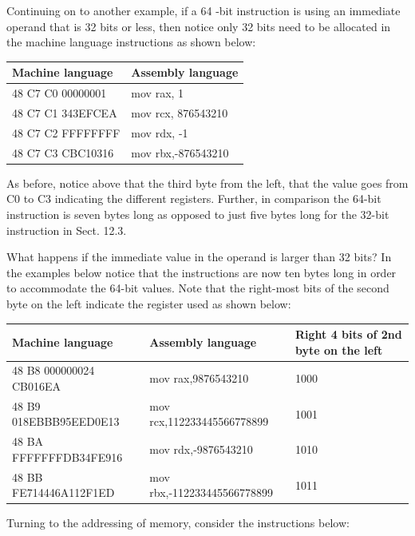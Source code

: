 \documentclass[10pt]{book}
\begin{document}
Continuing on to another example, if a 64 -bit instruction is using an immediate operand that is 32 bits or less, then notice only 32 bits need to be allocated in the machine language instructions as shown below:

\begin{center}
\begin{tabular}{|l|l|}
\hline
Machine language & Assembly language \\
\hline
48 C7 C0 00000001 & mov rax, 1 \\
\hline
48 C7 C1 343EFCEA & mov rcx, 876543210 \\
\hline
48 C7 C2 FFFFFFFF & mov rdx, -1 \\
\hline
48 C7 C3 CBC10316 & mov rbx,-876543210 \\
\hline
\end{tabular}
\end{center}

As before, notice above that the third byte from the left, that the value goes from C0 to C3 indicating the different registers. Further, in comparison the 64-bit instruction is seven bytes long as opposed to just five bytes long for the 32-bit instruction in Sect. 12.3.


What happens if the immediate value in the operand is larger than 32 bits? In the examples below notice that the instructions are now ten bytes long in order to accommodate the 64-bit values. Note that the right-most bits of the second byte on the left indicate the register used as shown below:

\begin{center}
\begin{tabular}{|l|l|l|}
\hline
Machine language & Assembly language & Right 4 bits of 2nd byte on the left \\
\hline
48 B8 000000024 CB016EA & mov rax,9876543210 & 1000 \\
\hline
48 B9 018EBBB95EED0E13 & mov rcx,112233445566778899 & 1001 \\
\hline
48 BA FFFFFFFDB34FE916 & mov rdx,-9876543210 & 1010 \\
\hline
48 BB FE714446A112F1ED & mov rbx,-112233445566778899 & 1011 \\
\hline
\end{tabular}
\end{center}

Turning to the addressing of memory, consider the instructions below:
\end{document}
